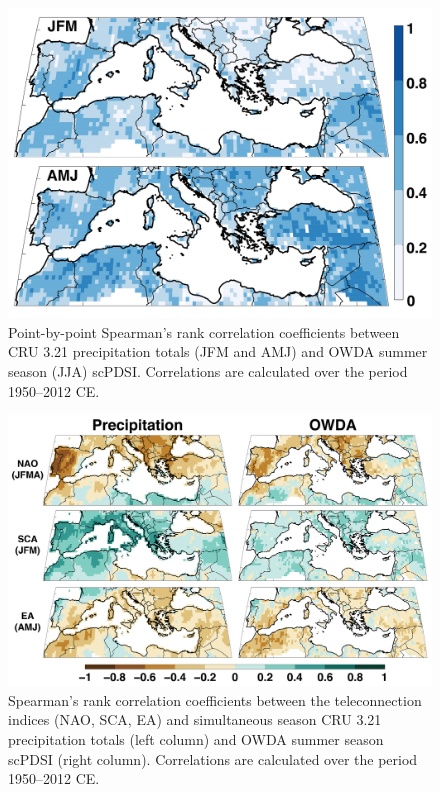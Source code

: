 \documentclass[draft,jgr]{AGUTeX}
\begin{document}
\begin{figure}
\center
\includegraphics[width=0.9\columnwidth]{fig_02_corr_owda_prec_MED1.png}
\caption{Point-by-point Spearman's rank correlation coefficients between CRU 3.21 precipitation totals (JFM and AMJ) and OWDA summer season (JJA) scPDSI. Correlations are calculated over the period 1950--2012 CE.}\label{placeholder}
\end{figure}

\begin{figure}
\center
\includegraphics[width=1.0\columnwidth]{fig_03_teleconn_corr_MED1.png}
\caption{Spearman's rank correlation coefficients between the teleconnection indices (NAO, SCA, EA) and simultaneous season CRU 3.21 precipitation totals (left column) and OWDA summer season scPDSI (right column). Correlations are calculated over the period 1950--2012 CE.}\label{placeholder}
\end{figure}
\end{document}
